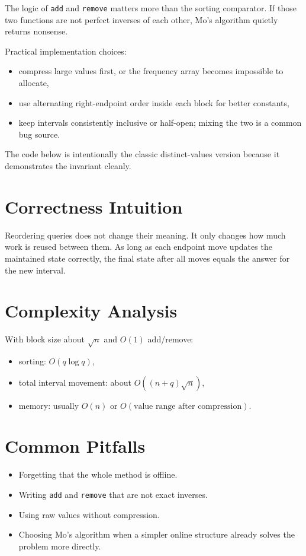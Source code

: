 The logic of \texttt{add} and \texttt{remove} matters more than the sorting comparator. If those two functions are not
perfect inverses of each other, Mo's algorithm quietly returns nonsense.

Practical implementation choices:

\begin{itemize}
  \item compress large values first, or the frequency array becomes impossible to allocate,
  \item use alternating right-endpoint order inside each block for better constants,
  \item keep intervals consistently inclusive or half-open; mixing the two is a common bug source.
\end{itemize}

The code below is intentionally the classic distinct-values version because it demonstrates the invariant cleanly.

\section*{Correctness Intuition}

Reordering queries does not change their meaning. It only changes how much work is reused between them. As long as each
endpoint move updates the maintained state correctly, the final state after all moves equals the answer for the new
interval.

\section*{Complexity Analysis}

With block size about \(\sqrt{n}\) and \(O(1)\) add/remove:

\begin{itemize}
  \item sorting: \(O(q \log q)\),
  \item total interval movement: about \(O((n+q)\sqrt{n})\),
  \item memory: usually \(O(n)\) or \(O(\text{value range after compression})\).
\end{itemize}

\section*{Common Pitfalls}

\begin{itemize}
  \item Forgetting that the whole method is offline.
  \item Writing \texttt{add} and \texttt{remove} that are not exact inverses.
  \item Using raw values without compression.
  \item Choosing Mo's algorithm when a simpler online structure already solves the problem more directly.
\end{itemize}

